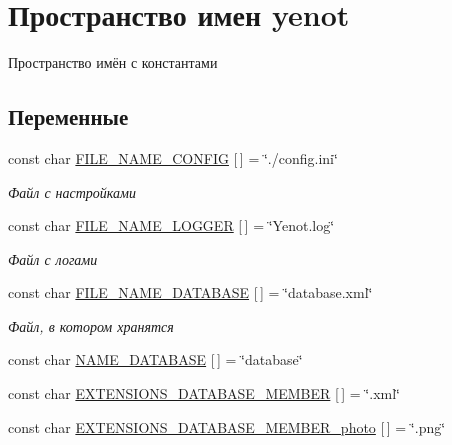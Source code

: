 \hypertarget{namespaceyenot}{}\section{Пространство имен yenot}
\label{namespaceyenot}


Пространство имён с константами  


\subsection*{Переменные}
\begin{DoxyCompactItemize}
\item 
const char \mbox{\hyperlink{namespaceyenot_a376e7adfbabcae01c8305ed17d47d576}{F\+I\+L\+E\+\_\+\+N\+A\+M\+E\+\_\+\+C\+O\+N\+F\+IG}} \mbox{[}$\,$\mbox{]} = \char`\"{}./config.\+ini\char`\"{}
\begin{DoxyCompactList}\small\item\em Файл с настройками \end{DoxyCompactList}\item 
const char \mbox{\hyperlink{namespaceyenot_a6fdda6751433c679b7976669aff150b8}{F\+I\+L\+E\+\_\+\+N\+A\+M\+E\+\_\+\+L\+O\+G\+G\+ER}} \mbox{[}$\,$\mbox{]} = \char`\"{}Yenot.\+log\char`\"{}
\begin{DoxyCompactList}\small\item\em Файл с логами \end{DoxyCompactList}\item 
const char \mbox{\hyperlink{namespaceyenot_ae254e34a07790b92c8085e559be10f38}{F\+I\+L\+E\+\_\+\+N\+A\+M\+E\+\_\+\+D\+A\+T\+A\+B\+A\+SE}} \mbox{[}$\,$\mbox{]} = \char`\"{}database.\+xml\char`\"{}
\begin{DoxyCompactList}\small\item\em Файл, в котором хранятся \end{DoxyCompactList}\item 
const char \mbox{\hyperlink{namespaceyenot_af2253e95acd84452c01f492019f814f0}{N\+A\+M\+E\+\_\+\+D\+A\+T\+A\+B\+A\+SE}} \mbox{[}$\,$\mbox{]} = \char`\"{}database\char`\"{}
\item 
const char \mbox{\hyperlink{namespaceyenot_aa5230dc84adb2ca08b014531f83cd3c9}{E\+X\+T\+E\+N\+S\+I\+O\+N\+S\+\_\+\+D\+A\+T\+A\+B\+A\+S\+E\+\_\+\+M\+E\+M\+B\+ER}} \mbox{[}$\,$\mbox{]} = \char`\"{}.xml\char`\"{}
\item 
const char \mbox{\hyperlink{namespaceyenot_abf6ea7d0c605b7432754b26575046d32}{E\+X\+T\+E\+N\+S\+I\+O\+N\+S\+\_\+\+D\+A\+T\+A\+B\+A\+S\+E\+\_\+\+M\+E\+M\+B\+E\+R\+\_\+photo}} \mbox{[}$\,$\mbox{]} = \char`\"{}.png\char`\"{}

\end{DoxyCompactItemize}
